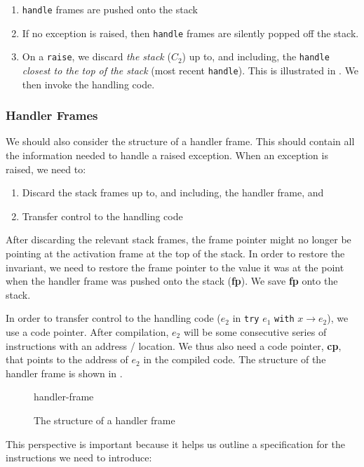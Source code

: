 \begin{enumerate}
    \item \texttt{handle} frames are pushed onto the stack
    \item If no exception is raised, then \texttt{handle} frames are silently popped off the stack.
    \item On a \texttt{raise}, we discard \textit{the stack} ($C_2$) up to, and including, the \texttt{handle} \textit{closest to the top of the stack} (most recent \texttt{handle}). This is illustrated in . We then invoke the handling code.
\end{enumerate}

\subsubsection{Handler Frames}
We should also consider the structure of a handler frame. This should contain all the information needed to handle a raised exception. When an exception is raised, we need to:
\begin{enumerate}
    \item Discard the stack frames up to, and including, the handler frame, and
    \item Transfer control to the handling code
\end{enumerate}

After discarding the relevant stack frames, the frame pointer might no longer be pointing at the activation frame at the top of the stack. In order to restore the invariant, we need to restore the frame pointer to the value it was at the point when the handler frame was pushed onto the stack (\textbf{fp}). We save \textbf{fp} onto the stack.

In order to transfer control to the handling code ($e_2$ in \texttt{try} $e_1$ \texttt{with} $x \to e_2$), we use a code pointer. After compilation, $e_2$ will be some consecutive series of instructions with an address / location. We thus also need a code pointer, \textbf{cp}, that points to the address of $e_2$ in the compiled code. The structure of the handler frame is shown in .

\begin{figure}[H]
    \centering
    {handler-frame}
    \caption{The structure of a handler frame}
    \label{fig:handler-frame}
\end{figure}

This perspective is important because it helps us outline a specification for the instructions we need to introduce:

